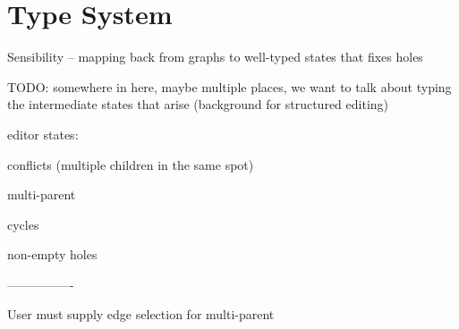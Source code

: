 
\section{Type System}%
\label{sec:Type System}

Sensibility -- mapping back from graphs
to well-typed states that fixes holes

TODO: somewhere in here, maybe multiple places, we want to talk about typing the intermediate states that arise (background for structured editing)

editor states:

conflicts (multiple children in the same spot)

multi-parent

cycles

non-empty holes

----------------

User must supply edge selection for multi-parent

